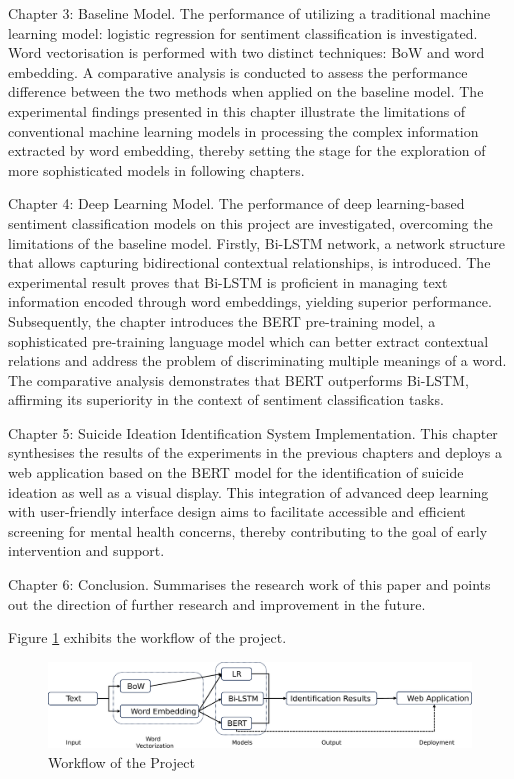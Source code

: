 \documentclass[ %
                    author={Bocheng Wang},
                supervisor={Dr. Qiang Liu},
                    degree={MSc},
                     title={A Research on Identification of Suicide Ideation in Texts with Multiple Models},
                      type={},
                      year={2024}]{dissertation}
\begin{document}
Chapter 3: Baseline Model. The performance of utilizing a traditional machine learning model: logistic regression for sentiment classification is investigated. Word vectorisation is performed with two distinct techniques: BoW and word embedding. A comparative analysis is conducted to assess the performance difference between the two methods when applied on the baseline model. The experimental findings presented in this chapter illustrate the limitations of conventional machine learning models in processing the complex information extracted by word embedding, thereby setting the stage for the exploration of more sophisticated models in following chapters.

Chapter 4: Deep Learning Model. The performance of deep learning-based sentiment classification models on this project are investigated, overcoming the limitations of the baseline model. Firstly, Bi-LSTM network, a network structure that allows capturing bidirectional contextual relationships, is introduced. The experimental result proves that Bi-LSTM is proficient in managing text information encoded through word embeddings, yielding superior performance. Subsequently, the chapter introduces the BERT pre-training model, a sophisticated pre-training language model which can better extract contextual relations and address the problem of discriminating multiple meanings of a word. The comparative analysis demonstrates that BERT outperforms Bi-LSTM, affirming its superiority in the context of sentiment classification tasks.

Chapter 5: Suicide Ideation Identification System Implementation. This chapter synthesises the results of the experiments in the previous chapters and deploys a web application based on the BERT model for the identification of suicide ideation as well as a visual display. This integration of advanced deep learning with user-friendly interface design aims to facilitate accessible and efficient screening for mental health concerns, thereby contributing to the goal of early intervention and support.

Chapter 6: Conclusion. Summarises the research work of this paper and points out the direction of further research and improvement in the future.

Figure \ref{fig:flow} exhibits the workflow of the project.

\begin{figure}[h]
      \centering
      \includegraphics[width=0.9\linewidth]{../img/flow.eps}
      \caption{Workflow of the Project}
      \label{fig:flow}
\end{figure}
\end{document}
